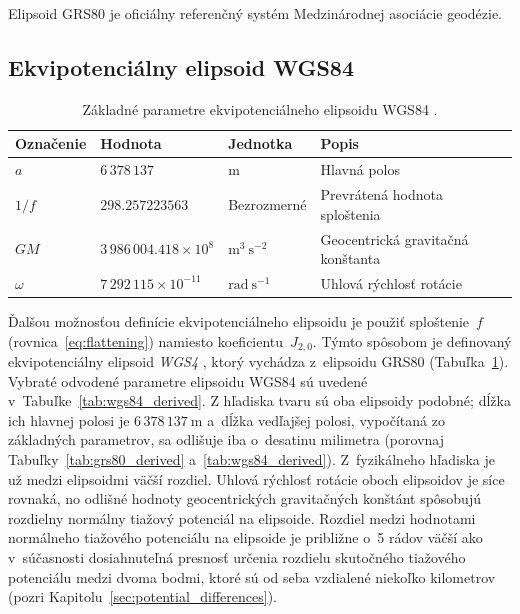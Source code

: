 \documentclass[a4paper, 12pt]{book}
\begin{document}
Elipsoid GRS80 je oficiálny referenčný systém Medzinárodnej asociácie geodézie.






\subsection{Ekvipotenciálny elipsoid WGS84}
\label{sec:wgs84}

\begin{table}
\begin{center}
\caption{Základné parametre ekvipotenciálneho elipsoidu WGS84 
\parencite{WGS84}.}
\label{tab:wgs84_fundamental}
\small
\begin{tabular}{l l l l}
\hline
Označenie & Hodnota & Jednotka & Popis\\
\hline
$a$       & $6\,378\,137$ & m & Hlavná polos\\
$1 \slash f$ & $298.257223563$ & Bezrozmerné & Prevrátená hodnota sploštenia\\
$GM$ & $3\,986\,004.418 \times 10^8$ & $\mathrm{m}^3 \ \mathrm{s}^{-2}$ 
& Geocentrická gravitačná konštanta\\
$\omega$ & $7\,292\,115 \times 10^{-11}$ & $\mathrm{rad} \ \mathrm{s}^{-1}$ 
& Uhlová rýchlosť rotácie\\
\hline
\end{tabular}
\end{center}
\end{table}

Ďalšou možnosťou definície ekvipotenciálneho elipsoidu je použiť sploštenie~$f$ 
(rovnica~\ref{eq:flattening}) namiesto koeficientu~$J_{2,0}$.  Týmto spôsobom 
je definovaný ekvipotenciálny elipsoid \emph{WGS4} 
\parencite[angl. \textit{World Geodetic System~1984};][]{WGS84}, ktorý vychádza 
z~elipsoidu GRS80 (Tabuľka~\ref{tab:wgs84_fundamental}).  Vybraté odvodené 
parametre elipsoidu WGS84 sú uvedené v~Tabuľke~\ref{tab:wgs84_derived}.  
Z hľadiska tvaru sú oba elipsoidy podobné; dĺžka ich hlavnej polosi je $6\, 
378\, 137\ \mathrm{m}$ a~dĺžka vedľajšej polosi, vypočítaná zo základných 
parametrov, sa odlišuje iba o~desatinu milimetra (porovnaj 
Tabuľky~\ref{tab:grs80_derived} a~\ref{tab:wgs84_derived}).  Z~fyzikálneho 
hľadiska je už medzi elipsoidmi väčší rozdiel.  Uhlová rýchlosť rotácie oboch 
elipsoidov je síce rovnaká, no odlišné hodnoty geocentrických gravitačných 
konštánt spôsobujú rozdielny normálny tiažový potenciál na elipsoide.  Rozdiel 
medzi hodnotami normálneho tiažového potenciálu na elipsoide je približne o~5 
rádov väčší ako v~súčasnosti dosiahnuteľná presnosť určenia rozdielu skutočného 
tiažového potenciálu medzi dvoma bodmi, ktoré sú od seba vzdialené niekoľko 
kilometrov (pozri Kapitolu~\ref{sec:potential_differences}).
\end{document}
